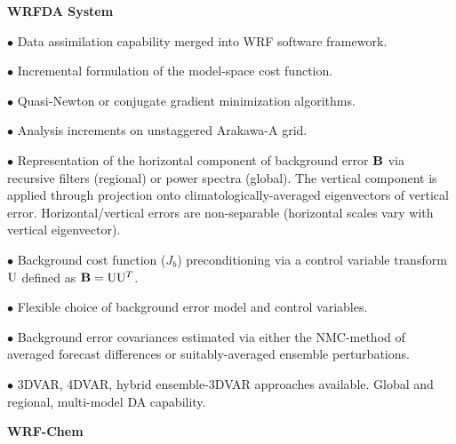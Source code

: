 \vskip 12pt
{\noindent\bf WRFDA System}
\vskip 12pt

\begin{description}
\setlength{\itemsep}{-5pt}
\item{$\bullet$} Data assimilation capability merged into WRF software framework.
%
\item{$\bullet$} Incremental formulation of the model-space cost function.
%
\item{$\bullet$} Quasi-Newton or conjugate gradient minimization algorithms.
%
\item{$\bullet$} Analysis increments on unstaggered Arakawa-A grid.
%
\item{$\bullet$} Representation of the horizontal component of background 
error ${\bf B}$ via recursive filters (regional) or power spectra (global). The
vertical component is applied through projection onto climatologically-averaged 
eigenvectors of vertical error. Horizontal/vertical errors are
non-separable (horizontal scales vary with vertical eigenvector).
%
\item{$\bullet$}  Background cost function ($J_b$) preconditioning 
via a control variable transform ${\rm U}$ defined as ${\bf B}={\rm U} {\rm U}^T$.
%
\item{$\bullet$} Flexible choice of background error model and control variables.
%
\item{$\bullet$} Background error covariances estimated via either the
NMC-method of averaged forecast differences or suitably-averaged
ensemble perturbations.
%
\item{$\bullet$} 3DVAR, 4DVAR, hybrid ensemble-3DVAR approaches available. 
Global and regional, multi-model DA capability.
%
\end{description}

\vskip 12pt
{\noindent\bf WRF-Chem}
\vskip 12pt

